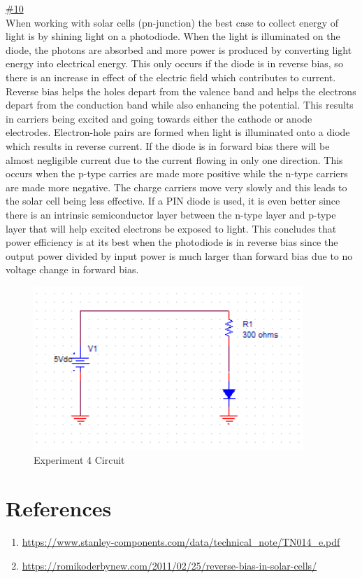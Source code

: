 \underline{\#10}
\\
When working with solar cells (pn-junction) the best case to collect energy of light is by shining light on a photodiode. When the light is illuminated on the diode, the photons are absorbed and more power is produced by converting light energy into electrical energy. This only occurs if the diode is in reverse bias, so there is an increase in effect of the electric field which contributes to current. Reverse bias helps the holes depart from the valence band and helps the electrons depart from the conduction band while also enhancing the potential. This results in carriers being excited and going towards either the cathode or anode electrodes. Electron-hole pairs are formed when light is illuminated onto a diode which results in reverse current. If the diode is in forward bias there will be almost negligible current due to the current flowing in only one direction. This occurs when the p-type carries are made more positive while the n-type carriers are made more negative. The charge carriers move very slowly and this leads to the solar cell being less effective. If a PIN diode is used, it is even better since there is an intrinsic semiconductor layer between the n-type layer and p-type layer that will help excited electrons be exposed to light. This concludes that power efficiency is at its best when the photodiode is in reverse bias since the output power divided by input power is much larger than forward bias due to no voltage change in forward bias.\\



\begin{figure}[h!]
	\centering
	\includegraphics{CircuitSchematic.PNG}
	\caption{Experiment 4 Circuit}
	\label{fig:Circuit_Pic}
\end{figure}

\section{References}
\scriptsize{
	\begin{enumerate}
		\item \url{https://www.stanley-components.com/data/technical_note/TN014_e.pdf}
		\item \url{https://romikoderbynew.com/2011/02/25/reverse-bias-in-solar-cells/}
	\end{enumerate}
}

